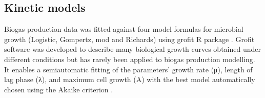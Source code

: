 \subsection{Kinetic models}
Biogas production data was fitted against four model formulas for microbial growth (Logistic, Gompertz, mod and Richards) using grofit R package \cite{Kahm_2010}. Grofit software was developed to describe many biological growth curves obtained under different conditions but has rarely been applied to biogas production modelling. It enables a semiautomatic fitting of the parameters’ growth rate (μ), length of lag phase (λ), and maximum cell growth (A) with the best model automatically chosen using the Akaike criterion \cite{Hasenbrink_2006}.